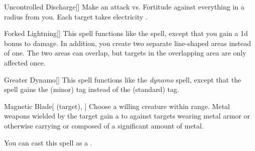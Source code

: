 \lowercase{\hypertarget{spell:Uncontrolled Discharge}{}}\label{spell:Uncontrolled Discharge}
\begin{apability}[\nth{2}]{\hypertarget{spell:Uncontrolled Discharge}{Uncontrolled Discharge}}[]
Make an attack vs. Fortitude against everything in a \areamed radius from you.
\hit Each target takes electricity .
\end{apability}
\vspace{0.25em}



\lowercase{\hypertarget{spell:Forked Lightning}{}}\label{spell:Forked Lightning}
\begin{apability}[\nth{3}]{\hypertarget{spell:Forked Lightning}{Forked Lightning}}[]
This spell functions like the  spell, except that you gain a \plus1d bonus to damage.
In addition, you create two separate line-shaped areas instead of one.
The two areas can overlap, but targets in the overlapping area are only affected once.
\end{apability}
\vspace{0.25em}



\lowercase{\hypertarget{spell:Greater Dynamo}{}}\label{spell:Greater Dynamo}
\begin{apability}[\nth{3}]{\hypertarget{spell:Greater Dynamo}{Greater Dynamo}}[]
This spell functions like the \textit{dynamo} spell, except that the spell gains the  (minor) tag instead of the  (standard) tag.
\end{apability}
\vspace{0.25em}



\lowercase{\hypertarget{spell:Magnetic Blade}{}}\label{spell:Magnetic Blade}
\begin{attuneability}[\nth{3}]{\hypertarget{spell:Magnetic Blade}{Magnetic Blade}}[ (target), ]
Choose a willing creature within \rngclose range.
Metal weapons wielded by the target gain a   to  against targets wearing metal armor or otherwise carrying or composed of a significant amount of metal.

You can cast this spell as a .
\end{attuneability}
\vspace{0.25em}



